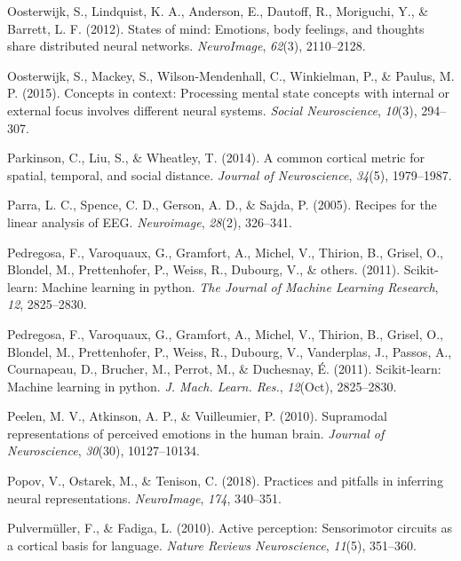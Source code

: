 \documentclass[12pt,american,a4paper,oneside,]{memoir} %
\begin{document}
\leavevmode\hypertarget{ref-oosterwijk2012states}{}%
Oosterwijk, S., Lindquist, K. A., Anderson, E., Dautoff, R., Moriguchi, Y., \& Barrett, L. F. (2012). States of mind: Emotions, body feelings, and thoughts share distributed neural networks. \emph{NeuroImage}, \emph{62}(3), 2110--2128.

\leavevmode\hypertarget{ref-oosterwijk2015concepts}{}%
Oosterwijk, S., Mackey, S., Wilson-Mendenhall, C., Winkielman, P., \& Paulus, M. P. (2015). Concepts in context: Processing mental state concepts with internal or external focus involves different neural systems. \emph{Social Neuroscience}, \emph{10}(3), 294--307.

\leavevmode\hypertarget{ref-parkinson2014common}{}%
Parkinson, C., Liu, S., \& Wheatley, T. (2014). A common cortical metric for spatial, temporal, and social distance. \emph{Journal of Neuroscience}, \emph{34}(5), 1979--1987.

\leavevmode\hypertarget{ref-Parra2005-um}{}%
Parra, L. C., Spence, C. D., Gerson, A. D., \& Sajda, P. (2005). Recipes for the linear analysis of EEG. \emph{Neuroimage}, \emph{28}(2), 326--341.

\leavevmode\hypertarget{ref-pedregosa2011scikit}{}%
Pedregosa, F., Varoquaux, G., Gramfort, A., Michel, V., Thirion, B., Grisel, O., Blondel, M., Prettenhofer, P., Weiss, R., Dubourg, V., \& others. (2011). Scikit-learn: Machine learning in python. \emph{The Journal of Machine Learning Research}, \emph{12}, 2825--2830.

\leavevmode\hypertarget{ref-Pedregosa2011-bp}{}%
Pedregosa, F., Varoquaux, G., Gramfort, A., Michel, V., Thirion, B., Grisel, O., Blondel, M., Prettenhofer, P., Weiss, R., Dubourg, V., Vanderplas, J., Passos, A., Cournapeau, D., Brucher, M., Perrot, M., \& Duchesnay, É. (2011). Scikit-learn: Machine learning in python. \emph{J. Mach. Learn. Res.}, \emph{12}(Oct), 2825--2830.

\leavevmode\hypertarget{ref-peelen2010supramodal}{}%
Peelen, M. V., Atkinson, A. P., \& Vuilleumier, P. (2010). Supramodal representations of perceived emotions in the human brain. \emph{Journal of Neuroscience}, \emph{30}(30), 10127--10134.

\leavevmode\hypertarget{ref-popov2018practices}{}%
Popov, V., Ostarek, M., \& Tenison, C. (2018). Practices and pitfalls in inferring neural representations. \emph{NeuroImage}, \emph{174}, 340--351.

\leavevmode\hypertarget{ref-pulvermuller2010active}{}%
Pulvermüller, F., \& Fadiga, L. (2010). Active perception: Sensorimotor circuits as a cortical basis for language. \emph{Nature Reviews Neuroscience}, \emph{11}(5), 351--360.
\end{document}
